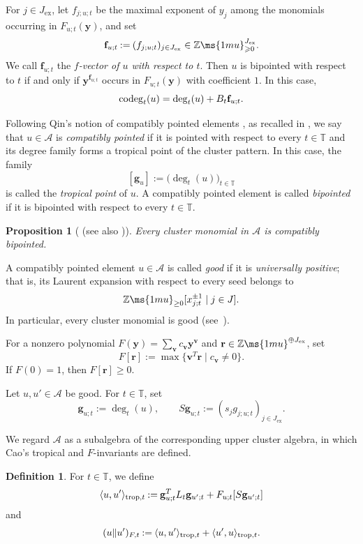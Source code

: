\documentclass[12pt, leqno]{amsart}
\numberwithin{equation}{section}
\theoremstyle{plain}
\newtheorem{proposition}[lemma]{Proposition}
\theoremstyle{definition}
\newtheorem{definition}[lemma]{Definition}
\renewcommand{\ge}{\geqslant}
\newcommand{\seteq}{\mathbin{:=}}
\newcommand{\ex}{\mathrm{ex}}
\newcommand{\Z}{\mathbb{Z}\ms{1mu}}
\newcommand{\codeg}{{\rm codeg}}
\newcommand{\trop}{{\rm trop}}
\newcommand{\bbT}{\mathbb{T}}
\newcommand{\bff}{\mathbf{f}}
\newcommand{\bfg}{\mathbf{g}}
\newcommand{\bfr}{\mathbf{r}}
\newcommand{\bfv}{\mathbf{v}}
\newcommand{\bfy}{\mathbf{y}}
\newcommand{\calA}{\mathcal{A}}
\begin{document}
For \(j\in J_{\ex}\), let \(f_{j;u;t}\) be the maximal exponent of
\(y_j\) among the monomials occurring in \(F_{u;t}(\bfy)\), and set
\[
\bff_{u;t}\seteq(f_{j;u;t})_{j\in J_{\ex}} \in \Z_{\ge0}^{J_\ex}.
\]
We call \(\bff_{u;t}\) the \emph{\(f\)-vector of \(u\) with respect
to \(t\)}.
Then \(u\) is bipointed with respect to \(t\) if and only if
\(\bfy^{\bff_{u;t}}\) occurs in \(F_{u;t}(\bfy)\) with coefficient
\(1\).  In this case,
\[
\codeg_t(u) = \deg_t(u)+B_t\bff_{u;t}.
\]

Following Qin's notion of compatibly pointed elements
\cite{Qin24}, as recalled in \cite[Definition~3.6]{Cao23}, we say
that \(u\in\calA\) is \emph{compatibly pointed} if it is pointed
with respect to every \(t\in\bbT\) and its degree family forms a
tropical point of the cluster pattern. In this case, the
family
\[
[\bfg_u]\seteq\bigl(\deg_t(u)\bigr)_{t\in\bbT}
\]
is called the \emph{tropical point} of \(u\).  A compatibly pointed
element is called \emph{bipointed} if it is bipointed with respect
to every \(t\in\bbT\).


\begin{proposition}[{\cite{FZ07,GHKK18} (see also \cite[Proposition~3.7]{Cao23})}]
\label{prop: cluster monomials are bipointed}
Every cluster monomial in \(\calA\) is compatibly bipointed.
\end{proposition}

A compatibly pointed element \(u\in\calA\) is called \emph{good} if
it is \emph{universally positive}; that is, its Laurent expansion
with respect to every seed belongs to
\[
\Z_{\geq0}[x_{j;t}^{\pm1}\mid j\in J].
\]
In particular, every cluster monomial is good (see~\cite[Proposition~3.7]{Cao23}). 

For a nonzero polynomial $F(\bfy)=\sum_{\bfv}c_{\bfv}\bfy^{\bfv}$ and \(\bfr\in\Z^{\oplus J_{\ex}}\), set
\[
F[\bfr]\seteq \max\{\bfv^T\bfr\mid c_{\bfv}\ne0\}.
\]
If \(F(0)=1\), then \(F[\bfr]\geq0\).

Let \(u,u'\in\calA\) be good.  For \(t\in\bbT\), set
\[
\bfg_{u;t}\seteq\deg_t(u), \qquad S\bfg_{u;t} \seteq (s_jg_{j;u;t})_{j\in J_{\ex}}.
\]

We regard \(\calA\) as a subalgebra of the corresponding upper
cluster algebra, in which Cao's tropical and \(F\)-invariants are
defined.

\begin{definition}\label{def: tropical and F-invariants}
 {\cite[Definition~4.6]{Cao23}} For $t \in \bbT$, we define
\[
\langle u,u'\rangle_{\trop,t} \seteq
\bfg_{u;t}^TL_t\bfg_{u';t} + F_{u;t}[S\bfg_{u';t}]
\]
and
\[
(u\Vert u')_{F,t} \seteq
\langle u,u'\rangle_{\trop,t} + \langle u',u\rangle_{\trop,t}.
\]
\end{definition}
\end{document}
